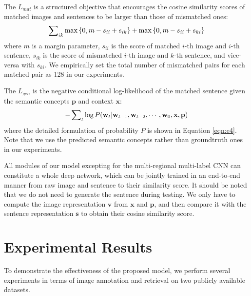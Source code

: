 \documentclass[10pt,twocolumn,letterpaper]{article}
\begin{document}
The $L_{mat}$ is a structured objective
that encourages the cosine similarity scores of matched images and sentences to be larger
than those of mismatched ones:
\begin{equation*}
\setlength{\abovedisplayskip}{5pt}
\setlength{\belowdisplayskip}{5pt}
\begin{aligned}
\sum\nolimits_{ik}{{\max \left\{ {0,m - s_{ii}+ s_{ik}} \right\}}}  + {{\max \left\{ {0,m - s_{ii} + s_{ki}} \right\}} }
\end{aligned}
\end{equation*}
where $m$ is a margin parameter,
$s_{ii}$ is the score of matched $i$-th image and $i$-th sentence,
$s_{ik}$ is the score of mismatched $i$-th image and $k$-th sentence,
and vice-versa with $s_{ki}$.
We empirically set the total number of mismatched pairs for each matched pair
as 128 in our experiments.



The $L_{gen}$ is the negative conditional log-likelihood of
the matched sentence given the semantic concepts $\textbf{p}$ and context $\textbf{x}$:
\begin{equation*}
\setlength{\abovedisplayskip}{5pt}
\setlength{\belowdisplayskip}{5pt}
 - \sum\nolimits_t {\log P(\textbf{w}_{t}|\textbf{w}_{t-1}, \textbf{w}_{t-2},\cdots,\textbf{w}_0,\textbf{x},\textbf{p})}
\end{equation*}
where the detailed formulation of probability $P$ is shown in Equation \ref{eqn:e4}.
Note that we use the predicted semantic concepts rather than
groundtruth ones in our experiments.

All modules of our model excepting for the multi-regional multi-label CNN
can constitute a whole deep network,
which can be jointly trained in an end-to-end manner from raw image and sentence to their similarity score.
It should be noted that we do not need to generate the sentence during testing.
We only have to compute the image representation $\textbf{v}$
from $\textbf{x}$ and $\textbf{p}$,
and then compare it with the sentence representation $\textbf{s}$
to obtain their cosine similarity score.






\section{Experimental Results}
To demonstrate the effectiveness of the proposed model,
we perform several experiments in terms of image annotation
and retrieval on two publicly available datasets.
\end{document}
